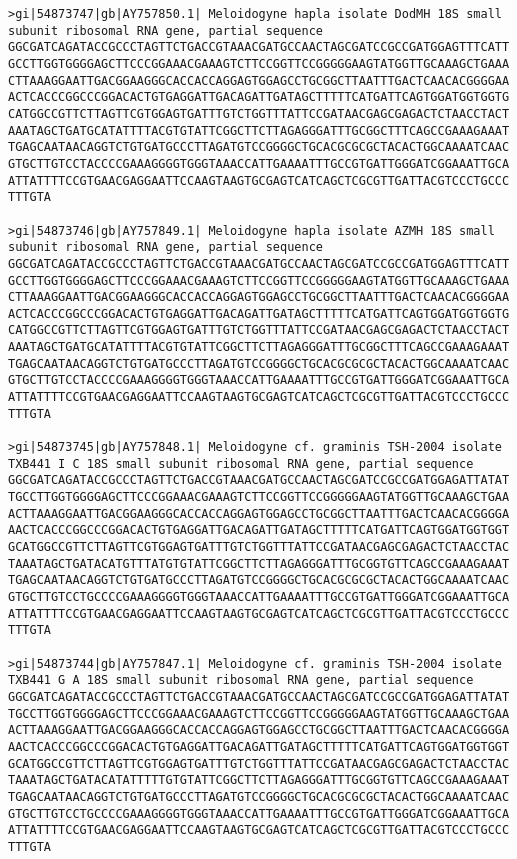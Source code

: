 \documentclass[11pt]{article}
\begin{document}
\begin{Verbatim}[commandchars=\\\{\}]
>gi|54873747|gb|AY757850.1| Meloidogyne hapla isolate DodMH 18S small subunit ribosomal RNA gene, partial sequence
GGCGATCAGATACCGCCCTAGTTCTGACCGTAAACGATGCCAACTAGCGATCCGCCGATGGAGTTTCATT
GCCTTGGTGGGGAGCTTCCCGGAAACGAAAGTCTTCCGGTTCCGGGGGAAGTATGGTTGCAAAGCTGAAA
CTTAAAGGAATTGACGGAAGGGCACCACCAGGAGTGGAGCCTGCGGCTTAATTTGACTCAACACGGGGAA
ACTCACCCGGCCCGGACACTGTGAGGATTGACAGATTGATAGCTTTTTCATGATTCAGTGGATGGTGGTG
CATGGCCGTTCTTAGTTCGTGGAGTGATTTGTCTGGTTTATTCCGATAACGAGCGAGACTCTAACCTACT
AAATAGCTGATGCATATTTTACGTGTATTCGGCTTCTTAGAGGGATTTGCGGCTTTCAGCCGAAAGAAAT
TGAGCAATAACAGGTCTGTGATGCCCTTAGATGTCCGGGGCTGCACGCGCGCTACACTGGCAAAATCAAC
GTGCTTGTCCTACCCCGAAAGGGGTGGGTAAACCATTGAAAATTTGCCGTGATTGGGATCGGAAATTGCA
ATTATTTTCCGTGAACGAGGAATTCCAAGTAAGTGCGAGTCATCAGCTCGCGTTGATTACGTCCCTGCCC
TTTGTA

>gi|54873746|gb|AY757849.1| Meloidogyne hapla isolate AZMH 18S small subunit ribosomal RNA gene, partial sequence
GGCGATCAGATACCGCCCTAGTTCTGACCGTAAACGATGCCAACTAGCGATCCGCCGATGGAGTTTCATT
GCCTTGGTGGGGAGCTTCCCGGAAACGAAAGTCTTCCGGTTCCGGGGGAAGTATGGTTGCAAAGCTGAAA
CTTAAAGGAATTGACGGAAGGGCACCACCAGGAGTGGAGCCTGCGGCTTAATTTGACTCAACACGGGGAA
ACTCACCCGGCCCGGACACTGTGAGGATTGACAGATTGATAGCTTTTTCATGATTCAGTGGATGGTGGTG
CATGGCCGTTCTTAGTTCGTGGAGTGATTTGTCTGGTTTATTCCGATAACGAGCGAGACTCTAACCTACT
AAATAGCTGATGCATATTTTACGTGTATTCGGCTTCTTAGAGGGATTTGCGGCTTTCAGCCGAAAGAAAT
TGAGCAATAACAGGTCTGTGATGCCCTTAGATGTCCGGGGCTGCACGCGCGCTACACTGGCAAAATCAAC
GTGCTTGTCCTACCCCGAAAGGGGTGGGTAAACCATTGAAAATTTGCCGTGATTGGGATCGGAAATTGCA
ATTATTTTCCGTGAACGAGGAATTCCAAGTAAGTGCGAGTCATCAGCTCGCGTTGATTACGTCCCTGCCC
TTTGTA

>gi|54873745|gb|AY757848.1| Meloidogyne cf. graminis TSH-2004 isolate TXB441 I C 18S small subunit ribosomal RNA gene, partial sequence
GGCGATCAGATACCGCCCTAGTTCTGACCGTAAACGATGCCAACTAGCGATCCGCCGATGGAGATTATAT
TGCCTTGGTGGGGAGCTTCCCGGAAACGAAAGTCTTCCGGTTCCGGGGGAAGTATGGTTGCAAAGCTGAA
ACTTAAAGGAATTGACGGAAGGGCACCACCAGGAGTGGAGCCTGCGGCTTAATTTGACTCAACACGGGGA
AACTCACCCGGCCCGGACACTGTGAGGATTGACAGATTGATAGCTTTTTCATGATTCAGTGGATGGTGGT
GCATGGCCGTTCTTAGTTCGTGGAGTGATTTGTCTGGTTTATTCCGATAACGAGCGAGACTCTAACCTAC
TAAATAGCTGATACATGTTTATGTGTATTCGGCTTCTTAGAGGGATTTGCGGTGTTCAGCCGAAAGAAAT
TGAGCAATAACAGGTCTGTGATGCCCTTAGATGTCCGGGGCTGCACGCGCGCTACACTGGCAAAATCAAC
GTGCTTGTCCTGCCCCGAAAGGGGTGGGTAAACCATTGAAAATTTGCCGTGATTGGGATCGGAAATTGCA
ATTATTTTCCGTGAACGAGGAATTCCAAGTAAGTGCGAGTCATCAGCTCGCGTTGATTACGTCCCTGCCC
TTTGTA

>gi|54873744|gb|AY757847.1| Meloidogyne cf. graminis TSH-2004 isolate TXB441 G A 18S small subunit ribosomal RNA gene, partial sequence
GGCGATCAGATACCGCCCTAGTTCTGACCGTAAACGATGCCAACTAGCGATCCGCCGATGGAGATTATAT
TGCCTTGGTGGGGAGCTTCCCGGAAACGAAAGTCTTCCGGTTCCGGGGGAAGTATGGTTGCAAAGCTGAA
ACTTAAAGGAATTGACGGAAGGGCACCACCAGGAGTGGAGCCTGCGGCTTAATTTGACTCAACACGGGGA
AACTCACCCGGCCCGGACACTGTGAGGATTGACAGATTGATAGCTTTTTCATGATTCAGTGGATGGTGGT
GCATGGCCGTTCTTAGTTCGTGGAGTGATTTGTCTGGTTTATTCCGATAACGAGCGAGACTCTAACCTAC
TAAATAGCTGATACATATTTTTGTGTATTCGGCTTCTTAGAGGGATTTGCGGTGTTCAGCCGAAAGAAAT
TGAGCAATAACAGGTCTGTGATGCCCTTAGATGTCCGGGGCTGCACGCGCGCTACACTGGCAAAATCAAC
GTGCTTGTCCTGCCCCGAAAGGGGTGGGTAAACCATTGAAAATTTGCCGTGATTGGGATCGGAAATTGCA
ATTATTTTCCGTGAACGAGGAATTCCAAGTAAGTGCGAGTCATCAGCTCGCGTTGATTACGTCCCTGCCC
TTTGTA


\end{Verbatim}
\end{document}
